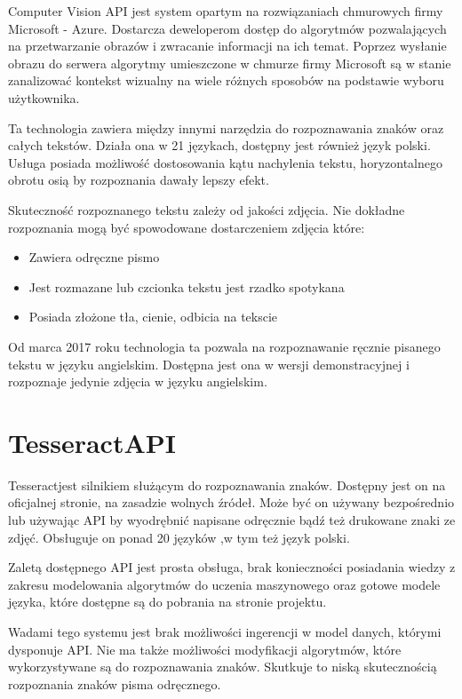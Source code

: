 \documentclass[brudnopis]{xmgr}
\begin{document}
Computer Vision API jest system opartym na rozwiązaniach chmurowych firmy Microsoft - Azure. Dostarcza deweloperom dostęp do algorytmów pozwalających na przetwarzanie obrazów i zwracanie informacji na ich temat. Poprzez wysłanie obrazu do serwera algorytmy umieszczone w chmurze firmy Microsoft są w stanie zanalizować kontekst wizualny na wiele różnych sposobów na podstawie wyboru użytkownika.

Ta technologia zawiera między innymi narzędzia do rozpoznawania znaków oraz całych tekstów. Działa ona w 21 językach, dostępny jest również język polski. Usługa posiada możliwość dostosowania kątu nachylenia tekstu, horyzontalnego obrotu osią by rozpoznania dawały lepszy efekt. 

Skuteczność rozpoznanego tekstu zależy od jakości zdjęcia. Nie dokładne rozpoznania mogą być spowodowane dostarczeniem zdjęcia które:

\begin{itemize}
\item
Zawiera odręczne pismo
\item
Jest rozmazane lub czcionka tekstu jest rzadko spotykana
\item
Posiada złożone tła, cienie, odbicia na tekscie
\end{itemize}

Od marca 2017 roku technologia ta pozwala na rozpoznawanie ręcznie pisanego tekstu w języku angielskim. Dostępna jest ona w wersji demonstracyjnej i rozpoznaje jedynie zdjęcia w języku angielskim.

\section{TesseractAPI}

Tesseractjest silnikiem służącym do rozpoznawania znaków. Dostępny jest on na oficjalnej stronie\cite{10}, na zasadzie wolnych źródeł. Może być on używany bezpośrednio lub używając API by wyodrębnić napisane odręcznie bądź też drukowane znaki ze zdjęć. Obsługuje on ponad 20 języków ,w tym też język polski.

Zaletą dostępnego API jest prosta obsługa, brak konieczności posiadania wiedzy z zakresu modelowania algorytmów do uczenia maszynowego oraz gotowe modele języka, które dostępne są do pobrania na stronie projektu.

Wadami tego systemu jest brak możliwości ingerencji w model danych, którymi dysponuje API. Nie ma także możliwości modyfikacji algorytmów, które wykorzystywane są do rozpoznawania znaków. Skutkuje to niską skutecznością rozpoznania znaków pisma odręcznego.
\end{document}

